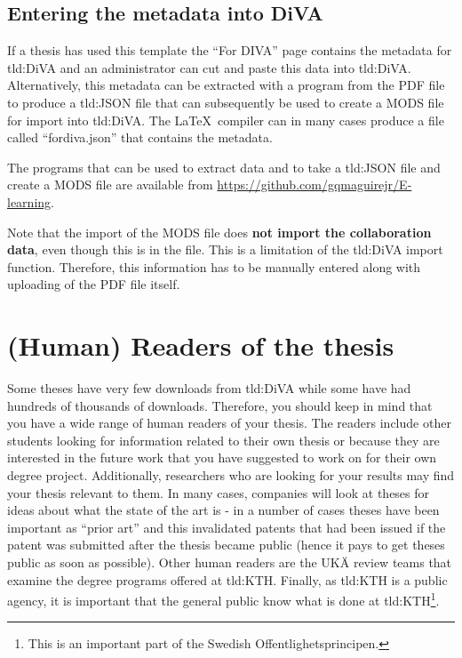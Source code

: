 \subsection{Entering the metadata into DiVA}
If a thesis has used this template the ``For DIVA'' page contains the metadata for \gls{tld:DiVA} and an administrator can cut and paste this data into \gls{tld:DiVA}. Alternatively, this metadata can be extracted with a program from the PDF file to produce a \gls{tld:JSON} file that can subsequently be used to create a MODS file for import into \gls{tld:DiVA}. The \LaTeX\ compiler can in many cases produce a file called ``fordiva.json'' that contains the metadata.

The programs that can be used to extract data and to take a \gls{tld:JSON} file and create a MODS file are available from \url{https://github.com/gqmaguirejr/E-learning}.

Note that the import of the MODS file does \textbf{not import the collaboration data}, even though this is in the file. This is a limitation of the \gls{tld:DiVA} import function. Therefore, this information has to be manually entered along with uploading of the PDF file itself.

\section{(Human) Readers of the thesis}
\label{sec:readers}
Some theses have very few downloads from \gls{tld:DiVA} while some have had hundreds of thousands of downloads. Therefore, you should keep in mind that you have a wide range of human readers of your thesis. The readers include other students looking for information related to their own thesis or because they are interested in the future work that you have suggested to work on for their own degree project. Additionally, researchers who are looking for your results may find your thesis relevant to them. In many cases, companies will look at theses for ideas about what the state of the art is - in a number of cases theses have been important as ``prior art'' and this invalidated patents that had been issued if the patent was submitted after the thesis became public (hence it pays to get theses public as soon as possible). Other human readers are the \foreignlanguage{swedish}{UKÄ} review teams that examine the degree programs offered at \gls{tld:KTH}. Finally, as \gls{tld:KTH} is a public agency, it is important that the general public know what is done at \gls{tld:KTH}\footnote{This is an important part of the Swedish \foreignlanguage{swedish}{Offentlighetsprincipen}.}.

